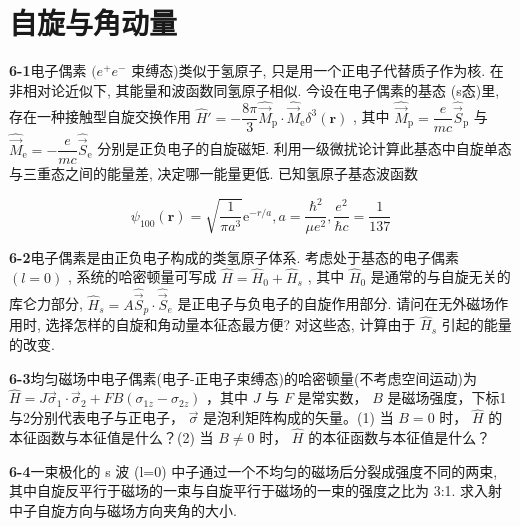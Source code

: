 \chapter{自旋与角动量}

\newpage


\textbf{6-1}\quad 电子偶素 $\displaystyle (e^{+}e^{-}$ 束缚态)类似于氢原子, 只是用一个正电子代替质子作为核. 在非相对论近似下, 其能量和波函数同氢原子相似. 今设在电子偶素的基态 (s态)里, 存在一种接触型自旋交换作用 $\displaystyle \hat{H}' = -\dfrac{8\pi}{3}\hat{\vec{M}}_{\mathrm{p}} \cdot \hat{\vec{M}}_{\mathrm{e}}\delta^{3}(\boldsymbol{r})$ , 其中 $\displaystyle \hat{\vec{M}}_{\mathrm{p}} = \dfrac{e}{mc}\hat{\vec{S}}_{\mathrm{p}}$ 与 $\displaystyle \hat{\vec{M}}_{\mathrm{e}} = -\dfrac{e}{mc}\hat{\vec{S}}_{\mathrm{e}}$ 分别是正负电子的自旋磁矩. 利用一级微扰论计算此基态中自旋单态与三重态之间的能量差, 决定哪一能量更低. 已知氢原子基态波函数

$$
\psi_ {1 0 0} (\boldsymbol {r}) = \sqrt {\dfrac {1}{\pi a ^ {3}}} \mathrm{e} ^ {- r / a}, a = \dfrac {\hbar^ {2}}{\mu e ^ {2}}, \dfrac {e ^ {2}}{\hbar c} = \dfrac {1}{1 3 7}
$$

\vfill

\newpage

\textbf{6-2}\quad 电子偶素是由正负电子构成的类氢原子体系. 考虑处于基态的电子偶素 $\displaystyle (l = 0)$ , 系统的哈密顿量可写成 $\displaystyle \hat{H} = \hat{H}_0 + \hat{H}_s$ , 其中 $\displaystyle \hat{H}_0$ 是通常的与自旋无关的库仑力部分, $\displaystyle \hat{H}_s = A\hat{\vec{S}}_p \cdot \hat{\vec{S}}_e$ 是正电子与负电子的自旋作用部分. 请问在无外磁场作用时, 选择怎样的自旋和角动量本征态最方便? 对这些态, 计算由于 $\displaystyle \hat{H}_s$ 引起的能量的改变.

\vfill

\newpage

\textbf{6-3}\quad 均匀磁场中电子偶素(电子-正电子束缚态)的哈密顿量(不考虑空间运动)为 $\displaystyle \hat{H} = J\vec{\sigma}_{1} \cdot \vec{\sigma}_{2} + FB(\sigma_{1z} - \sigma_{2z})$ ，其中 $\displaystyle J$ 与 $\displaystyle F$ 是常实数， $\displaystyle B$ 是磁场强度，下标1与2分别代表电子与正电子， $\displaystyle \vec{\sigma}$ 是泡利矩阵构成的矢量。(1) 当 $\displaystyle B = 0$ 时， $\displaystyle \hat{H}$ 的本征函数与本征值是什么？(2) 当 $\displaystyle B \neq 0$ 时， $\displaystyle \hat{H}$ 的本征函数与本征值是什么？

\vfill

\newpage

\textbf{6-4}\quad 一束极化的 s 波 (l=0) 中子通过一个不均匀的磁场后分裂成强度不同的两束, 其中自旋反平行于磁场的一束与自旋平行于磁场的一束的强度之比为 3:1. 求入射中子自旋方向与磁场方向夹角的大小.

